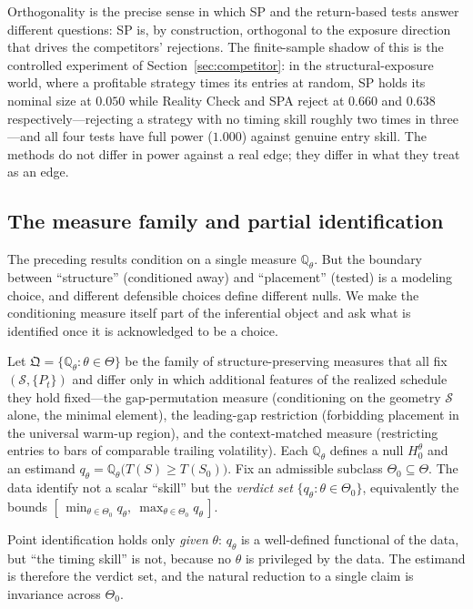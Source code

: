 Orthogonality is the precise sense in which SP and the return-based tests answer
different questions: SP is, by construction, orthogonal to the exposure direction
that drives the competitors' rejections. The finite-sample shadow of this is the
controlled experiment of Section~\ref{sec:competitor}: in the structural-exposure
world, where a profitable strategy times its entries at random, SP holds its
nominal size at $0.050$ while Reality Check and SPA reject at $0.660$ and $0.638$
respectively---rejecting a strategy with no timing skill roughly two times in
three---and all four tests have full power ($1.000$) against genuine entry skill.
The methods do not differ in power against a real edge; they differ in what they
treat as an edge.

\subsection{The measure family and partial identification}

The preceding results condition on a single measure $\mathbb{Q}_\theta$. But the
boundary between ``structure'' (conditioned away) and ``placement'' (tested) is a
modeling choice, and different defensible choices define different nulls. We make
the conditioning measure itself part of the inferential object and ask what is
identified once it is acknowledged to be a choice.

\begin{definition}
\label{def:measure-family}
Let $\mathfrak Q=\{\mathbb{Q}_\theta:\theta\in\Theta\}$ be the family of
structure-preserving measures that all fix $(\mathcal S,\{P_t\})$ and differ only
in which additional features of the realized schedule they hold fixed---the
gap-permutation measure (conditioning on the geometry $\mathcal S$ alone, the
minimal element), the leading-gap restriction (forbidding placement in the
universal warm-up region), and the context-matched measure (restricting entries
to bars of comparable trailing volatility). Each $\mathbb{Q}_\theta$ defines a null
$H_0^\theta$ and an estimand $q_\theta=\mathbb{Q}_\theta\big(T(S)\ge
T(S_0)\big)$. Fix an admissible subclass $\Theta_0\subseteq\Theta$. The data
identify not a scalar ``skill'' but the \emph{verdict set}
$\{q_\theta:\theta\in\Theta_0\}$, equivalently the bounds
$[\,\min_{\theta\in\Theta_0}q_\theta,\ \max_{\theta\in\Theta_0}q_\theta\,]$.
\end{definition}

Point identification holds only \emph{given} $\theta$: $q_\theta$ is a
well-defined functional of the data, but ``the timing skill'' is not, because no
$\theta$ is privileged by the data. The estimand is therefore the verdict set,
and the natural reduction to a single claim is invariance across $\Theta_0$.

